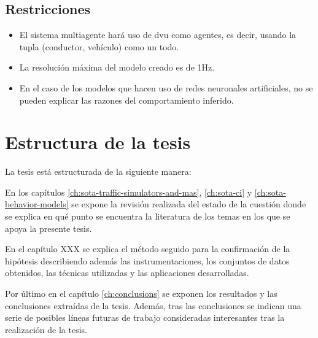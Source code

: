 \subsection{Restricciones}

\begin{itemize}
	\item El sistema multiagente hará uso de \gls{dvu} como agentes, es decir, usando la tupla (conductor, vehículo) como un todo.
	\item La resolución máxima del modelo creado es de 1Hz.
	\item En el caso de los modelos que hacen uso de redes neuronales artificiales, no se pueden explicar las razones del comportamiento inferido.
\end{itemize}

\section{Estructura de la tesis}
\label{ch:intro:structure}

La tesis está estructurada de la siguiente manera:

En los capítulos \ref{ch:sota-traffic-simulators-and-mas}, \ref{ch:sota-ci} y \ref{ch:sota-behavior-models} se expone la revisión realizada del estado de la cuestión donde se explica en qué punto se encuentra la literatura de los temas en los que se apoya la presente tesis.

En el capítulo XXX se explica el método seguido para la confirmación de la hipótesis describiendo además las instrumentaciones, los conjuntos de datos obtenidos, las técnicas utilizadas y las aplicaciones desarrolladas.

Por último en el capítulo \ref{ch:conclusions} se exponen los resultados y las conclusiones extraídas de la tesis. Además, tras las conclusiones se indican una serie de posibles líneas futuras de trabajo consideradas interesantes tras la realización de la tesis.
